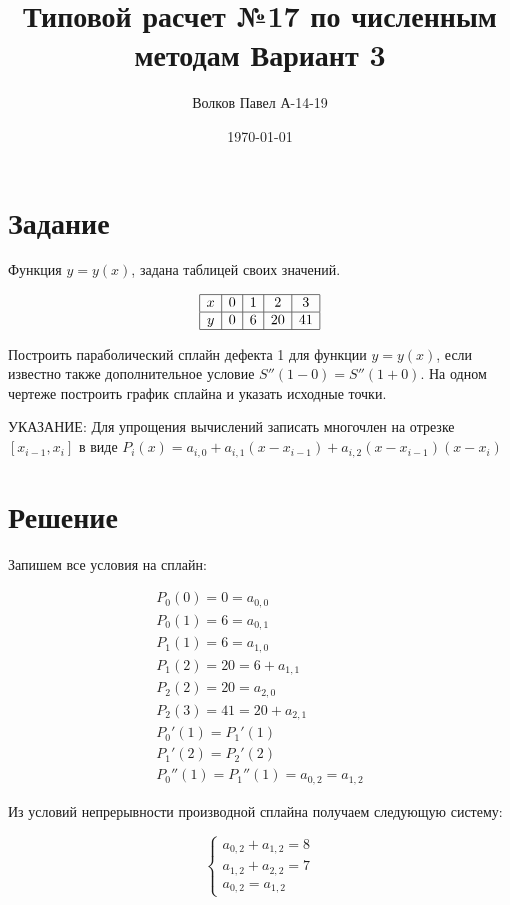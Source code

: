 \documentclass[a4paper,12pt]{report} %
\author{Волков Павел А-14-19}
\title{Типовой расчет №17 по численным методам Вариант 3}
\date{\today}
\begin{document}

\maketitle

\newpage
\section*{Задание}

Функция $y = y(x)$, задана таблицей своих значений.

\[
\begin{array}{| c | c | c | c | c |}
	\hline
	x & 0 & 1 & 2 & 3  \\ \hline
	y & 0 & 6 & 20 & 41  \\ \hline
\end{array}
\]

Построить параболический сплайн дефекта 1 для функции $y = y(x)$, если известно также дополнительное условие $S''(1 - 0) = S''(1 + 0)$. На одном чертеже построить график сплайна и указать исходные точки.

УКАЗАНИЕ: Для упрощения вычислений  записать многочлен на отрезке $[x_{i-1}, x_i]$ в виде $P_i(x) = a_{i, 0} + a_{i, 1}(x - x_{i-1}) + a_{i, 2}(x - x_{i-1})(x - x_i)$

\section*{Решение}

Запишем все условия на сплайн:

\begin{gather}
	P_0(0) = 0 = a_{0, 0}\\
	P_0(1) = 6 = a_{0, 1}\\
	P_1(1) = 6 = a_{1, 0}\\
	P_1(2) = 20 = 6 + a_{1, 1}\\
	P_2(2) = 20 = a_{2, 0}\\
	P_2(3) = 41 = 20 + a_{2, 1}\\
	P_0'(1) = P_1'(1) \\
	P_1'(2) = P_2'(2) \\
	P_0''(1) = P_1''(1) = a_{0, 2} = a_{1, 2}
\end{gather}

Из условий непрерывности производной сплайна получаем следующую систему:


\[
	\left\{
		\begin{aligned}
		a_{0, 2} + a_{1, 2} = 8\\
		a_{1, 2} + a_{2, 2} = 7 \\
		a_{0, 2} = a_{1, 2}
		\end{aligned}
	\right.
\]
\end{document}
